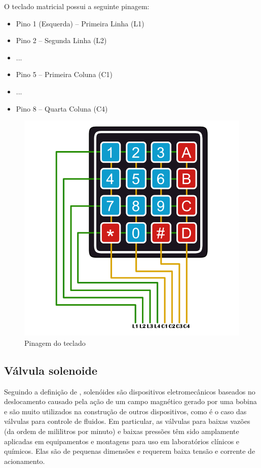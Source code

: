 O teclado matricial possui a seguinte pinagem:

\begin{itemize}
	\item Pino 1 (Esquerda) – Primeira Linha (L1)
	\item Pino 2  – Segunda Linha (L2)
	\item ...
	\item Pino 5 – Primeira Coluna (C1)
	\item ...
	\item Pino 8 – Quarta Coluna (C4)
\end{itemize}

\begin{figure}[htbp]
	\centering
	\includegraphics[scale=0.3]{figuras/keypad-1024x1024-pins.png}
	\caption{Pinagem do teclado}
	\label{teclado-pins}
\end{figure}

\subsection{Válvula solenoide}

Seguindo a definição de \cite{da2002modulo}, solenóides são dispositivos eletromecânicos baseados no deslocamento causado pela ação de um campo magnético gerado por uma bobina e são muito utilizados na construção de outros dispositivos, como é o caso das válvulas para controle de fluidos. Em particular, as válvulas para baixas vazões (da ordem de mililitros por minuto) e baixas pressões têm sido amplamente aplicadas em equipamentos e montagens para uso em laboratórios clínicos e químicos. Elas são de pequenas dimensões e requerem baixa tensão e corrente de acionamento.

